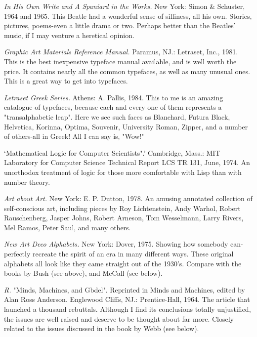  {\sl In His Own Write and A Spaniard in the Works.} New York: Simon \& Schuster, 1964 and 1965. This Beatle had a wonderful sense of silliness, all his own. Stories, pictures, poems-even a little drama or two. Perhaps better than the Beatles' music, if I may venture a heretical opinion.

 {\sl Graphic Art Materials Reference Manual.} Paramus, NJ.: Letraset, Inc., 1981. This is the best inexpensive typeface manual available, and is well worth the price. It contains nearly all the common typefaces, as well as many unusual ones. This is a great way to get into typefaces.

 {\sl Letraset Greek Series.} Athens: A. Pallis, 1984. This to me is an amazing catalogue of typefaces, because each and every one of them represents a "transalphabetic leap". Here we see such faces as Blanchard, Futura Black, Helvetica, Korinna, Optima, Souvenir, University Roman, Zipper, and a number of others-all in Greek! All I can say is, "Wow!"

 `Mathematical Logic for Computer Scientists".' Cambridge, Mass.: MIT Laboratory for Computer Science Technical Report LCS TR 131, June, 1974. An unorthodox treatment of logic for those more comfortable with Lisp than with number theory.

 {\sl Art about Art.} New York: E. P. Dutton, 1978. An amusing annotated collection of self-conscious art, including pieces by Roy Lichtenstein, Andy Warhol, Robert Rauschenberg, Jasper Johns, Robert Arneson, Tom Wesselmann, Larry Rivers, Mel Ramos, Peter Saul, and many others.

 {\sl New Art Deco Alphabets.} New York: Dover, 1975. Showing how somebody can-perfectly recreate the spirit of an era in many different ways. These original alphabets all look like they came straight out of the 1930's. Compare with the books by Bush (see above), and McCall (see below).

 {\sl R.} "Minds, Machines, and Gbdel". Reprinted in Minds and Machines, edited by Alan Ross Anderson. Englewood Cliffs, NJ.: Prentice-Hall, 1964. The article that launched a thousand rebuttals. Although I find its conclusions totally unjustified, the issues are well raised and deserve to be thought about far more. Closely related to the issues discussed in the book by Webb (see below).

